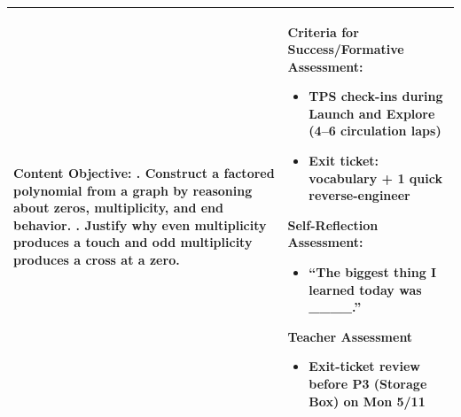 \documentclass[11pt]{article}
\begin{document}
\vspace{-1.2pt}
\noindent
\begin{tabularx}{\textwidth}{|>{\hsize=1.1\hsize}X|>{\hsize=0.9\hsize}X|}
\hline
\textbf{Content Objective:} \newline\newline
1. Construct a factored polynomial from a graph by reasoning about zeros, multiplicity, and end behavior. \newline\newline
2. Justify why even multiplicity produces a touch and odd multiplicity produces a cross at a zero. &
\textbf{Criteria for Success/Formative Assessment:}
\begin{itemize}[label=$\bullet$, leftmargin=*, nosep]
    \item \textbf{TPS check-ins during Launch and Explore (4--6 circulation laps)}
    \item \textbf{Exit ticket: vocabulary + 1 quick reverse-engineer}
\end{itemize}
\vspace{0.5em}
\textbf{Self-Reflection Assessment:}
\begin{itemize}[label=$\bullet$, leftmargin=*, nosep]
    \item \textbf{``The biggest thing I learned today was \_\_\_\_.''}
\end{itemize}
\vspace{0.5em}
\textbf{Teacher Assessment}
\begin{itemize}[label=$\bullet$, leftmargin=*, nosep]
    \item \textbf{Exit-ticket review before P3 (Storage Box) on Mon 5/11}
\end{itemize} \\
\hline
\end{tabularx}

\newpage
\end{document}
